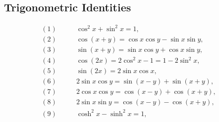 \subsection{Trigonometric Identities}

\begin{properties}
\label{prop:ti}
\begin{equation*}
\begin{split}
(1) \qquad & \cos^2 x + \sin^2 x = 1,  \\
(2) \qquad & \cos(x+y) = \cos x \cos y - \sin x \sin y, \\
(3) \qquad & \sin(x+y) = \sin x \cos y + \cos x \sin y, \\
(4) \qquad & \cos(2x) = 2\cos^2 x - 1 = 1 - 2 \sin^2 x, \\
(5) \qquad & \sin(2x) = 2\sin x \cos x, \\
(6) \qquad & 2\sin x \cos y = \sin(x-y)+\sin(x+y), \\
(7) \qquad & 2\cos x \cos y = \cos(x-y)+\cos(x+y), \\
(8) \qquad & 2\sin x \sin y = \cos(x-y)-\cos(x+y), \\
(9) \qquad & \cosh^2 x - \sinh^2 x = 1, \\
\end{split}
\end{equation*}
\end{properties}

